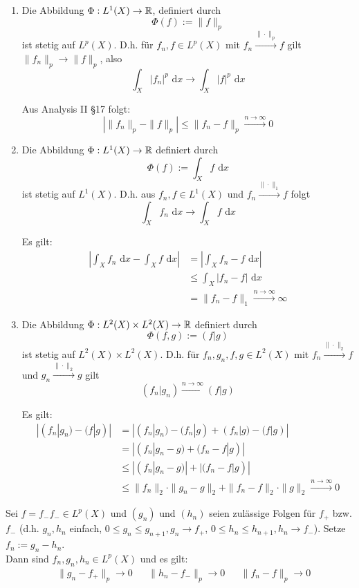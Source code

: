 \documentclass[a4paper,twoside,DIV15,BCOR12mm,chapterprefix=true,headings=onelinechapter]{scrbook}
\begin{document}
\begin{wichtigesbeispiel}
\label{Beispiel 16.6}
\begin{enumerate}
\item Die Abbildung $\Phi:L^1(X)\to\mathbb{R}$, definiert durch
\[\Phi(f):=\|f\|_p\]
ist stetig auf $L^p(X)$. D.h. für $f_n,f\in L^p(X)$ mit $f_n\stackrel{\|\cdot\|_p}\to f$ gilt $\|f_n\|_p\to\|f\|_p$, also
\[\int_X|f_n|^p\text{ d}x\to\int_X|f|^p\text{ d}x\] 
\begin{beweis}
Aus Analysis II §17 folgt:
\[| \|f_n\|_p-\|f\|_p |\le \|f_n-f\|_p\stackrel{n\to\infty}\to 0\]
\end{beweis}
\item Die Abbildung $\Phi:L^1(X)\to\mathbb{R}$ definiert durch
\[\Phi(f):=\int_X f\text{ d}x\]
ist stetig auf $L^1(X)$. D.h. aus $f_n,f\in L^1(X)$ und $f_n\stackrel{\|\cdot\|_1}\to f$ folgt
\[\int_X f_n\text{ d}x\to\int_X f \text{ d}x\]
\begin{beweis}
Es gilt:
\begin{align*}
|\int_X f_n \text{ d}x-\int_X f \text{ d}x| &=|\int_X f_n-f \text{ d}x|\\
&\le \int_X |f_n-f| \text{ d}x\\
&= \|f_n-f\|_1\stackrel{n\to\infty}\to \infty
\end{align*}
\end{beweis}
\item Die Abbildung $\Phi:L^2(X)\times L^2(X)\to\mathbb{R}$ definiert durch
\[\Phi(f,g):=(f|g)\]
ist stetig auf $L^2(X)\times L^2(X)$. D.h. für $f_n,g_n,f,g\in L^2(X)$ mit $f_n\stackrel{\|\cdot\|_2}\to f$ und $g_n\stackrel{\|\cdot\|_2}\to g$ gilt
\[(f_n|g_n)\stackrel{n\to\infty}\to(f|g)\]
\begin{beweis}
Es gilt:
\begin{align*}
|(f_n|g_n)-(f|g)|&=|(f_n|g_n)-(f_n|g)+(f_n|g)-(f|g)|\\
&=|(f_n|g_n-g)+(f_n-f|g)|\\
&\le |(f_n|g_n-g)|+|(f_n-f|g)|\\
&\le \|f_n\|_2\cdot \|g_n-g\|_2 + \|f_n-f\|_2\cdot\|g\|_2\stackrel{n\to\infty}\to 0
\end{align*}
\end{beweis}
\end{enumerate}
\end{wichtigesbeispiel}

\begin{satz}
\label{Satz 16.7}
Sei $f=f_-f_-\in L^p(X)$ und $(g_n)$ und $(h_n)$ seien zulässige Folgen für $f_+$ bzw. $f_-$ (d.h. $g_n,h_n$ einfach, $0\le g_n\le g_{n+1}, g_n\to f_+$, $0\le h_n\le h_{n+1}, h_n\to f_-$). Setze $f_n:=g_n-h_n$.\\
Dann sind $f_n,g_n,h_n\in L^p(X)$ und es gilt:
\begin{align*}
&\|g_n-f_+\|_p\to 0&&\|h_n-f_-\|_p\to 0&&\|f_n-f\|_p\to 0
\end{align*}
\end{satz}
\end{document}
